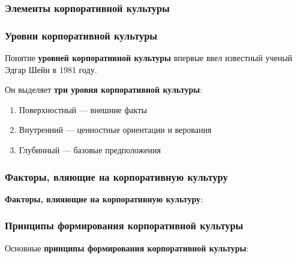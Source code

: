 \subsubsection{Элементы корпоративной культуры}

\begin{multienumerate}
\end{multienumerate}

\subsubsection{Уровни корпоративной культуры}

Понятие \textbf{уровней корпоративной культуры} впервые ввел известный ученый Эдгар Шейн в 1981 году.

Он выделяет \textbf{три уровня корпоративной культуры}:

\begin{enumerate}
    \item Поверхностный — внешние факты
    \item Внутренний — ценностные ориентации и верования
    \item Глубинный — базовые предположения
\end{enumerate}

\subsubsection{Факторы, вляющие на корпоративную культуру}

\textbf{Факторы, влияющие на корпоративную культуру}:

\begin{multienumerate}
\end{multienumerate}

\subsubsection{Принципы формирования корпоративной культуры}

Основные \textbf{принципы формирования корпоративной культуры}:

\begin{multienumerate}
\end{multienumerate}

